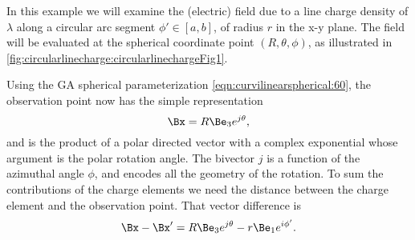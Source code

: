 %
%
In this example we will examine the (electric) field due to a line charge density of \( \lambda \) along a circular arc segment \( \phi' \in [a,b] \), of radius \( r \) in the x-y plane.
The field will be evaluated at the
spherical coordinate point \( (R, \theta, \phi) \), as illustrated in \cref{fig:circularlinecharge:circularlinechargeFig1}.

Using the GA spherical parameterization \cref{eqn:curvilinearspherical:60}, the
%
%
%
%
observation point now has the simple representation
\begin{equation}\label{eqn:circularlinecharge:60}
\Bx = R \Be_3 e^{j \theta },
\end{equation}
and is the product of a polar directed vector with a complex exponential whose argument is the polar rotation angle.
The bivector \( j \) is a function of the azimuthal angle \( \phi \), and encodes all the geometry of the rotation.
To sum the contributions of the charge elements we need the distance between the charge element and the observation point.
That vector difference is
\begin{equation}\label{eqn:circularlinecharge:80}
\Bx - \Bx'
=
R \Be_3 e^{j \theta } - r \Be_1 e^{i \phi'}.
\end{equation}

